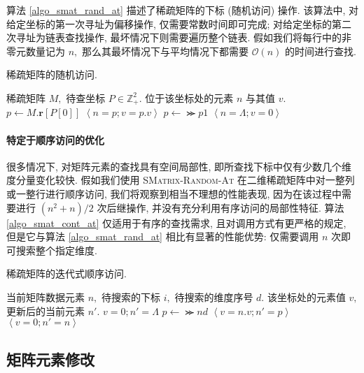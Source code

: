 算法 \ref{algo_smat_rand_at} 描述了稀疏矩阵的下标 (随机访问) 操作. 该算法中, 对给定坐标的第一次寻址为偏移操作, 仅需要常数时间即可完成; 对给定坐标的第二次寻址为链表查找操作, 最坏情况下则需要遍历整个链表. 假如我们将每行中的非零元数量记为 $n,$ 那么其最坏情况下与平均情况下都需要 $\mathcal{O}(n)$ 的时间进行查找.
\begin{breakablealgorithm}
\caption{稀疏矩阵的随机访问.}
\label{algo_smat_rand_at}
\begin{algorithmic}[1]
\Require 稀疏矩阵 $M,$ 待查坐标 $P \in \mathbb{Z}_{+}^{2}.$
\Ensure 位于该坐标处的元素 $n$ 与其值 $v.$
    \State $p \gets M.\bm{r}[P[0]]$
            \State \Return $\left\langle n=p; v=p.v \right\rangle$
        \EndIf
        \State $p \gets \Succ{p}{1}$
    \EndWhile
    \State \Return $\left\langle n=\Lambda; v=0 \right\rangle$
\EndFunction
\end{algorithmic}
\end{breakablealgorithm}

\paragraph{特定于顺序访问的优化} 很多情况下, 对矩阵元素的查找具有空间局部性, 即所查找下标中仅有少数几个维度分量变化较快. 假如我们使用 \textsc{SMatrix-Random-At} 在二维稀疏矩阵中对一整列或一整行进行顺序访问, 我们将观察到相当不理想的性能表现, 因为在该过程中需要进行 $(n^2 + n) / 2$ 次后继操作, 并没有充分利用有序访问的局部性特征. 算法 \ref{algo_smat_cont_at} 仅适用于有序的查找需求, 且对调用方式有更严格的规定, 但是它与算法 \ref{algo_smat_rand_at} 相比有显著的性能优势: 仅需要调用 $n$ 次即可搜索整个指定维度.
\begin{breakablealgorithm}
\caption{稀疏矩阵的迭代式顺序访问.}
\label{algo_smat_cont_at}
\begin{algorithmic}[1]
\Require 当前矩阵数据元素 $n,$ 待搜索的下标 $i,$ 待搜索的维度序号 $d.$
\Ensure 该坐标处的元素值 $v,$ 更新后的当前元素 $n'.$
        \State \Return $v=0; n'=\Lambda$
    \EndIf
    \State $p \gets \Succ{n}{d}$
        \State \Return $\left\langle v=n.v; n'=p \right\rangle$
    \EndIf
    \State \Return $\left\langle v=0; n'=n \right\rangle$
\EndFunction
\end{algorithmic}
\end{breakablealgorithm}

\subsection{矩阵元素修改}

